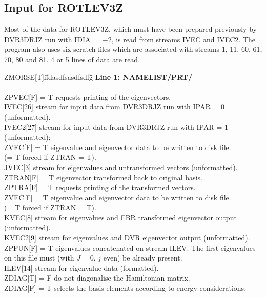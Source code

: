 \documentclass{elsart}
\begin{document}
\subsection{Input for ROTLEV3Z}

Most of the data for ROTLEV3Z, which must have been prepared previously by
DVR3DRJZ run with IDIA $= -2$, is read from streams IVEC and IVEC2.
 The program also uses six
scratch files which are associated with streams 1, 11, 60, 61, 70, 80 and 81.
4 or 5 lines
of data are read. \\
\begin{tabbing}
ZMORSE[T]i\=    fdasdfsasdfsdfg\=   \=             \kill
{\bf Line 1: NAMELIST/PRT/}\\
\\
ZPVEC[F] \> = T requests printing of the eigenvectors.\\
IVEC[26]\> stream for input data from DVR3DRJZ run with IPAR = 0 (unformatted).\\
IVEC2[27]\> stream for input data from DVR3DRJZ run with IPAR = 1  (unformatted);\\
ZVEC[F] \> = T eigenvalue and eigenvector data to be written to disk file.\\
        \> (= T forced if ZTRAN = T).\\
JVEC[3] \> stream for eigenvalues and untransformed vectors
(unformatted).\\
ZTRAN[F] \> = T eigenvector transformed back to original basis.\\
ZPTRA[F] \> = T requests printing of the transformed vectors.\\
ZVEC[F] \> = T eigenvalue and eigenvector data to be written to disk file.\\
        \> (= T forced if ZTRAN = T).\\
KVEC[8] \> stream for eigenvalues and  FBR transformed eigenvector output
(unformatted).\\
KVEC2[9] \> stream for eigenvalues and  DVR eigenvector output
(unformatted).\\
ZPFUN[F]\> = T eigenvalues concatenated on stream ILEV. The first
eigenvalues \\ \> on this file must (with $J=0$, $j$ even) be already
present.\\
ILEV[14] \> stream for eigenvalue data (formatted).\\
ZDIAG[T] \> = F do not diagonalise the Hamiltonian matrix.\\
ZDIAG[F] \> = T selects the basis elements according to energy considerations.\\

\end{tabbing}
\end{document}
